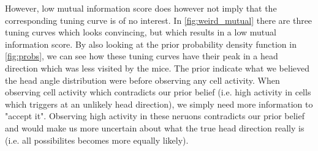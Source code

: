However, low mutual information score does however not imply that the corresponding tuning curve is of no interest. In \cref{fig:weird_mutual} there are three tuning curves which looks convincing, but which results in a low mutual information score. By also looking at the prior probability density function in \cref{fig:probs}, we can see how these tuning curves have their peak in a head direction which was less visited by the mice. The prior indicate what we believed the head angle distribution were before observing any cell activity. When observing cell activity which contradicts our prior belief (i.e. high activity in cells which triggers at an unlikely head direction), we simply need more information to "accept it". Observing high activity in these neruons contradicts our prior belief and would make us more uncertain about what the true head direction really is (i.e. all possibilites becomes more equally likely). 

